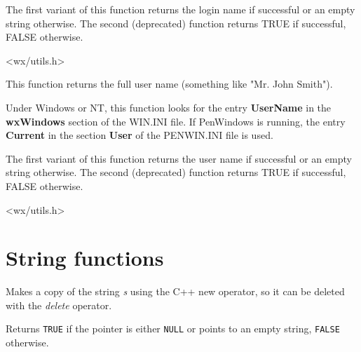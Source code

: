 The first variant of this function returns the login name if successful or an
empty string otherwise. The second (deprecated) function returns TRUE
if successful, FALSE otherwise.




<wx/utils.h>

\label{wxgetusername}



This function returns the full user name (something like "Mr. John Smith").

Under Windows or NT, this function looks for the entry {\bf UserName}\rtfsp
in the {\bf wxWindows} section of the WIN.INI file. If PenWindows
is running, the entry {\bf Current} in the section {\bf User} of
the PENWIN.INI file is used.

The first variant of this function returns the user name if successful or an
empty string otherwise. The second (deprecated) function returns TRUE
if successful, FALSE otherwise.




<wx/utils.h>

\section{String functions}



Makes a copy of the string {\it s} using the C++ new operator, so it can be
deleted with the {\it delete} operator.

\label{wxisempty}


Returns {\tt TRUE} if the pointer is either {\tt NULL} or points to an empty
string, {\tt FALSE} otherwise.

\label{wxstricmp}


